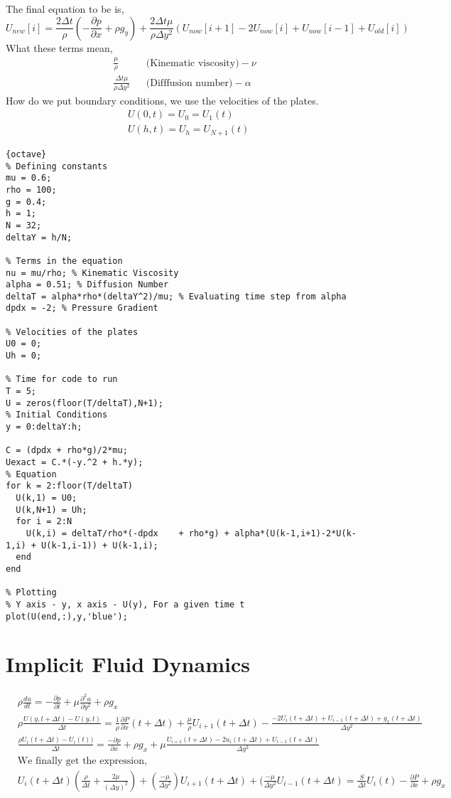 \documentclass{report}
\begin{document}
  The final equation to be is,
  \[
    U_{new}[i] = \frac{2 \Delta t}{\rho}(-\frac{\partial p}{\partial x} + \rho g_y) + \frac{2 \Delta t \mu}{\rho \Delta y^2}(U_{now}[i+1] - 2U_{now}[i] + U_{now}[i-1] + U_{old}[i])
  \]
  What these terms mean,
  \begin{align*}
    \frac{\mu}{\rho} & & \text{(Kinematic viscosity)}-\nu \\
    \frac{\Delta t\mu}{\rho \Delta y^2} & & \text{(Difffusion number)}-\alpha
  \end{align*}
  How do we put boundary conditions, we use the velocities of the plates.
  \begin{align*}
   &U(0,t) = U_0 = U_1(t)  \\
   &U(h,t) = U_h = U_{N+1}(t)
  \end{align*}
\begin{lstlisting}{octave}
% Defining constants
mu = 0.6;
rho = 100;
g = 0.4;
h = 1;
N = 32;
deltaY = h/N;

% Terms in the equation
nu = mu/rho; % Kinematic Viscosity
alpha = 0.51; % Diffusion Number
deltaT = alpha*rho*(deltaY^2)/mu; % Evaluating time step from alpha
dpdx = -2; % Pressure Gradient

% Velocities of the plates
U0 = 0;
Uh = 0;

% Time for code to run
T = 5;
U = zeros(floor(T/deltaT),N+1);
% Initial Conditions
y = 0:deltaY:h;

C = (dpdx + rho*g)/2*mu;
Uexact = C.*(-y.^2 + h.*y);
% Equation
for k = 2:floor(T/deltaT)
  U(k,1) = U0;
  U(k,N+1) = Uh;
  for i = 2:N
    U(k,i) = deltaT/rho*(-dpdx    + rho*g) + alpha*(U(k-1,i+1)-2*U(k-1,i) + U(k-1,i-1)) + U(k-1,i);
  end
end

% Plotting
% Y axis - y, x axis - U(y), For a given time t
plot(U(end,:),y,'blue');
\end{lstlisting}
\section{Implicit Fluid Dynamics}
\begin{align*}
&\rho \frac{du}{dt} = - \frac{\partial p}{\partial t} + \mu \frac{\partial^2 u}{\partial y^2} + \rho g_x \\
&\rho \frac{U(y, t + \Delta t) - U(y,t)}{\Delta t} =\frac{1}{\rho} \frac{\partial P}{\partial x}(t + \Delta t) + \frac{\mu}{\rho}U_{i+1}(t+\Delta t) - \frac{-2U_i(t+\Delta t) + U_{i-1}(t+\Delta t) + g_x(t+\Delta t)}{\Delta y^2} \\
&\frac{\rho U_i(t+\Delta t) - U_i(t))}{\Delta t} = \frac{-\partial p}{\partial x} + \rho g_x + \mu \frac{U_{i+1}(t + \Delta t) - 2 u_i (t+\Delta t) + U_{i-1}(t+\Delta t)}{\Delta y^2}\\
&\text{We finally get the expression,} \\
&U_{i}(t+\Delta t)(\frac{\rho}{\Delta t} + \frac{2\mu}{(\Delta y)^2}) + (\frac{-\mu}{\Delta y^2})U_{i+1}(t+\Delta t) + (\frac{-\mu}{\Delta y^2}U_{i-1}(t+\Delta t) = \frac{S}{\Delta t}U_i(t) - \frac{\partial P}{\partial x} + \rho g_x\\
\end{align*}
\end{document}
